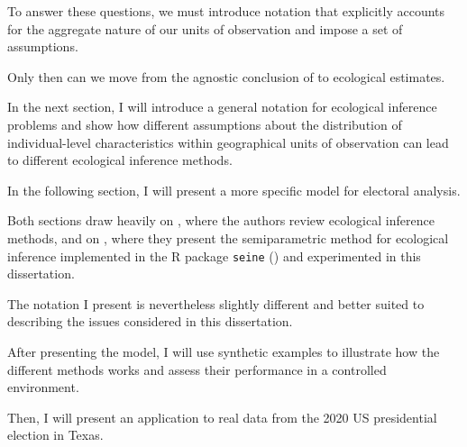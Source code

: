 To answer these questions, we must introduce notation that explicitly accounts for the aggregate nature of our units of observation and impose a set of assumptions.

Only then can we move from the agnostic conclusion of \citet{Robinson1950} to ecological estimates.

In the next section, I will introduce a general notation for ecological inference problems and show how different assumptions about the distribution of individual-level characteristics within geographical units of observation can lead to different ecological inference methods.

In the following section, I will present a more specific model for electoral analysis.

Both sections draw heavily on \citet{kuriwaki2026roleconfounderslinearityecological}, where the authors review ecological inference methods, and on \citet{mccartan2025identificationsemiparametricestimationconditional}, where they present the semiparametric method for ecological inference implemented in the R package \texttt{seine} (\citet{seine}) and experimented in this dissertation.

The notation I present is nevertheless slightly different and better suited to describing the issues considered in this dissertation.

After presenting the model, I will use synthetic examples to illustrate how the different methods works and assess their performance in a controlled environment.

Then, I will present an application to real data from the 2020 US presidential election in Texas.













